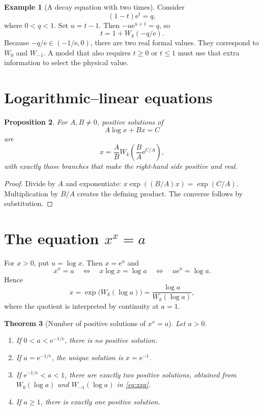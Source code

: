 \documentclass[11pt,oneside]{book}
\newtheorem{theorem}{Theorem}[chapter]
\newtheorem{proposition}[theorem]{Proposition}
\theoremstyle{definition}
\newtheorem{example}[theorem]{Example}
\theoremstyle{remark}
\newcommand{\ee}{\mathrm e}
\begin{document}
\begin{example}[A decay equation with two times]
Consider
\[
 (1-t)\ee^t=q,
\]
where $0<q<1$.  Set $u=t-1$.  Then $-u\ee^{u+1}=q$, so
\[
 t=1+W_k(-q/\ee).
\]
Because $-q/\ee\in(-1/\ee,0)$, there are two real formal values.  They
correspond to $W_0$ and $W_{-1}$.  A model that also requires $t\ge0$ or
$t\le1$ must use that extra information to select the physical value.
\end{example}

\section{Logarithmic--linear equations}

\begin{proposition}\label{prop:loglinear}
For $A,B\ne0$, positive solutions of
\begin{equation}\label{eq:loglinear}
 A\log x+Bx=C
\end{equation}
are
\begin{equation}\label{eq:loglinearsol}
 x=\frac AB W_k\!\left(\frac BA\ee^{C/A}\right),
\end{equation}
with exactly those branches that make the right-hand side positive and real.
\end{proposition}

\begin{proof}
Divide by $A$ and exponentiate:
$x\exp((B/A)x)=\exp(C/A)$.  Multiplication by $B/A$ creates the defining
product.  The converse follows by substitution.
\end{proof}

\section{The equation $x^x=a$}

For $x>0$, put $u=\log x$.  Then $x=\ee^u$ and
\[
 x^x=a
 \quad\Longleftrightarrow\quad
 x\log x=\log a
 \quad\Longleftrightarrow\quad
 u\ee^u=\log a.
\]
Hence
\begin{equation}\label{eq:xxa}
 x=\exp\bigl(W_k(\log a)\bigr)
   =\frac{\log a}{W_k(\log a)},
\end{equation}
where the quotient is interpreted by continuity at $a=1$.

\begin{theorem}[Number of positive solutions of $x^x=a$]\label{thm:xxa}
Let $a>0$.
\begin{enumerate}[label=\textup{(\roman*)}]
\item If $0<a<\ee^{-1/\ee}$, there is no positive solution.
\item If $a=\ee^{-1/\ee}$, the unique solution is $x=\ee^{-1}$.
\item If $\ee^{-1/\ee}<a<1$, there are exactly two positive solutions,
obtained from $W_0(\log a)$ and $W_{-1}(\log a)$ in \eqref{eq:xxa}.
\item If $a\ge1$, there is exactly one positive solution.
\end{enumerate}
\end{theorem}
\end{document}

